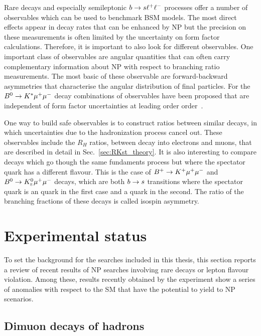 Rare decays and especially semileptonic $b\rightarrow s\ell^+\ell^-$ processes offer a number
of observables which can be used to benchmark BSM models.
The most direct effects appear in decay rates that can be enhanced by NP but the precision on
these measurements is often limited by the uncertainty on form factor calculations.
Therefore, it is important to also look for different observables.
One important class of observables are angular quantities that can often carry complementary 
information about NP with respect to branching ratio measurements. The most basic of these
observable are forward-backward asymmetries that characterise the angular distribution of final particles. 
For the $B^0\rightarrow K^*\mu^+\mu^-$ decay combinations of observables have been proposed
that are independent of form factor uncertainties at leading order order~\cite{TomRDreview}.

One way to build safe observables is to construct ratios between similar
decays, in which uncertainties due to the hadronization process cancel out.
These observables include the $R_H$ ratios, between \Bz decay into electrons and muons,
that are described in detail in Sec.~\ref{sec:RKst_theory}.
It is also interesting to compare decays which go though the same fundaments process but
where the spectator quark has a different flavour. This is the case of $B^+\rightarrow K^+\mu^+\mu^-$ and $B^0\rightarrow K^0_{\rm\scriptscriptstyle S}\mu^+\mu^-$
decays, which are both $b\rightarrow s$ transitions where the spectator quark is an \uquark quark
in the first case and a \dquark quark in the second. The ratio of the branching fractions of these
decays is called isospin asymmetry.


\section{Experimental status}

To set the background for the searches included in this thesis, this section reports a review
of recent results of NP searches involving rare decays or lepton flavour violation.
Among these, results recently obtained by the \lhcb experiment show a series of anomalies
with respect to the SM that have the potential to yield to NP scenarios.


\subsection{Dimuon decays of \bquark hadrons}


